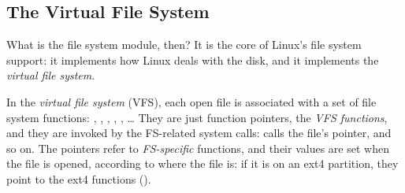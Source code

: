 \subsection{The Virtual File System}

What is the file system module, then? It is the core of Linux's file system support: it implements how Linux deals with the disk, and it implements the \emph{virtual file system}.

\begin{definition}
  In the \emph{virtual file system} (VFS), each open file is associated with a set of file system functions: , , , , , \dots{} They are just function pointers, the \emph{VFS functions}, and they are invoked by the FS-related system calls:  calls the file's  pointer, and so on. The pointers refer to \emph{FS-specific} functions, and their values are set when the file is opened, according to where the file is: if it is on an ext4 partition, they point to the ext4 functions ().
\end{definition}

